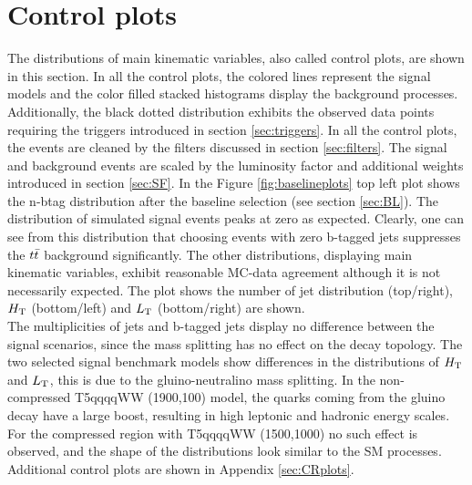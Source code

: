 \section{Control plots}
The distributions of main kinematic variables, also called control plots, are shown in this section. In all the control plots, the colored lines represent the signal models and the color filled stacked histograms display the background processes. Additionally, the black dotted distribution exhibits the observed data points requiring the triggers introduced in section \ref{sec:triggers}. In all the control plots, the events are cleaned by the filters discussed in section \ref{sec:filters}. The signal and background events are scaled by the luminosity factor and additional weights introduced in section \ref{sec:SF}. In the Figure \ref{fig:baselineplots} top left plot shows the n-btag distribution after the baseline selection (see section \ref{sec:BL}). The distribution of simulated signal events peaks at zero as expected. Clearly, one can see from this distribution that choosing events with zero b-tagged jets suppresses the $t\bar{t}$ background significantly. The other distributions, displaying main kinematic variables, exhibit reasonable MC-data agreement although it is not necessarily expected. The plot shows the number of jet distribution (top/right), $H_{\rm T}$ (bottom/left) and $L_{\rm T}$ (bottom/right) are shown. \\
The multiplicities of jets and b-tagged jets display no difference between the signal scenarios, since the mass splitting has no effect on the decay topology. 
The two selected signal benchmark models show differences in the distributions of $H_{\rm T}$ and $L_{\rm T}$, this is due to the gluino-neutralino mass splitting. In the non-compressed T5qqqqWW (1900,100) model, the quarks coming from the gluino decay have a large boost, resulting in high leptonic and hadronic energy scales. For the compressed region with T5qqqqWW (1500,1000) no such effect is observed, and the shape of the distributions look similar to the SM processes. \\
Additional control plots are shown in Appendix \ref{sec:CRplots}. 
